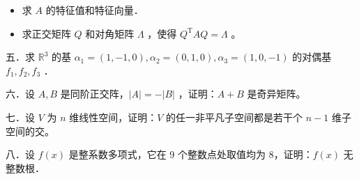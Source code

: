 \documentclass{article}
\begin{document}
\begin{itemize}
  \item[（1）] 求 \(A\) 的特征值和特征向量．
  \item[（2）] 求正交矩阵 \(Q\) 和对角矩阵 \(\Lambda\) ，使得 \(Q^{\mathrm{T}} A Q=\Lambda\) 。
\end{itemize}

五．求 \(\mathbb{R}^{3}\) 的基 \(\alpha_{1}=(1,-1,0), \alpha_{2}=(0,1,0), \alpha_{3}=(1,0,-1)\) 的对偶基 \(f_{1}, f_{2}, f_{3}\) ．

六．设 \(A, B\) 是同阶正交阵，\(|A|=-|B|\) ，证明：\(A+B\) 是奇异矩阵。

七．设 \(V\) 为 \(n\) 维线性空间，证明：\(V\) 的任一非平凡子空间都是若干个 \(n-1\) 维子空间的交。

八．设 \(f(x)\) 是整系数多项式，它在 9 个整数点处取值均为 8，证明：\(f(x)\) 无整数根．
\end{document}
